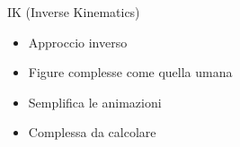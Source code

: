 \documentclass[10pt]{beamer}
\begin{document}
\begin{frame}{IK (Inverse Kinematics)}					
		\begin{itemize}[<+- | alert@+>]							
    \item Approccio inverso											%
    \item Figure complesse come quella umana		%
		\item Semplifica le animazioni							%
    \item Complessa da calcolare                %
  \end{itemize}                                 %
\end{frame}
\end{document}
